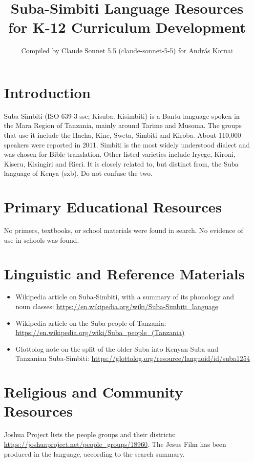 \documentclass[12pt]{article}
\title{Suba-Simbiti Language Resources for K-12 Curriculum Development}
\author{Compiled by Claude Sonnet 5.5 (claude-sonnet-5-5) for Andr\'as Kornai}
\date{}
\begin{document}
\maketitle

\section{Introduction}
Suba-Simbiti (ISO 639-3 ssc; Kisuba, Kisimbiti) is a Bantu language spoken in the Mara Region of Tanzania, mainly around Tarime and Musoma. The groups that use it include the Hacha, Kine, Sweta, Simbiti and Kiroba. About 110,000 speakers were reported in 2011. Simbiti is the most widely understood dialect and was chosen for Bible translation. Other listed varieties include Iryege, Kironi, Kiseru, Kisingiri and Rieri. It is closely related to, but distinct from, the Suba language of Kenya (sxb). Do not confuse the two.

\section{Primary Educational Resources}
No primers, textbooks, or school materials were found in search. No evidence of use in schools was found.

\section{Linguistic and Reference Materials}
\begin{itemize}
\item Wikipedia article on Suba-Simbiti, with a summary of its phonology and noun classes: \url{https://en.wikipedia.org/wiki/Suba-Simbiti_language}
\item Wikipedia article on the Suba people of Tanzania: \url{https://en.wikipedia.org/wiki/Suba_people_(Tanzania)}
\item Glottolog note on the split of the older Suba into Kenyan Suba and Tanzanian Suba-Simbiti: \url{https://glottolog.org/resource/languoid/id/suba1254}
\end{itemize}

\section{Religious and Community Resources}
Joshua Project lists the people groups and their districts: \url{https://joshuaproject.net/people_groups/18960}. The Jesus Film has been produced in the language, according to the search summary.
\end{document}
